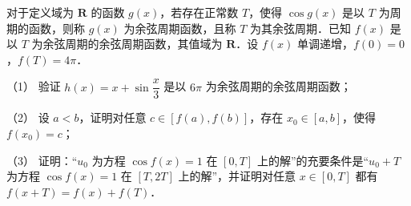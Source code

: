\begin{question}
对于定义域为 \(\mathbf{R}\) 的函数 \(g(x)\)，若存在正常数 \(T\)，使得 \(\cos g(x)\) 是以 \(T\) 为周期的函数，则称 \(g(x)\) 为余弦周期函数，且称 \(T\) 为其余弦周期．已知 \(f(x)\) 是以 \(T\) 为余弦周期的余弦周期函数，其值域为 \(\mathbf{R}\)．设 \(f(x)\) 单调递增，\(f(0)=0\)，\(f(T)=4\pi\)．

（1） 验证 \(h(x)=x+\sin\dfrac{x}{3}\) 是以 \(6\pi\) 为余弦周期的余弦周期函数；

（2） 设 \(a<b\)，证明对任意 \(c\in[f(a),f(b)]\)，存在 \(x_{0}\in[a,b]\)，使得 \(f(x_{0})=c\)；

（3） 证明：“\(u_{0}\) 为方程 \(\cos f(x)=1\) 在 \([0,T]\) 上的解”的充要条件是“\(u_{0}+T\) 为方程 \(\cos f(x)=1\) 在 \([T,2T]\) 上的解”，并证明对任意 \(x\in[0,T]\) 都有 \(f(x+T)=f(x)+f(T)\)．

\end{question}